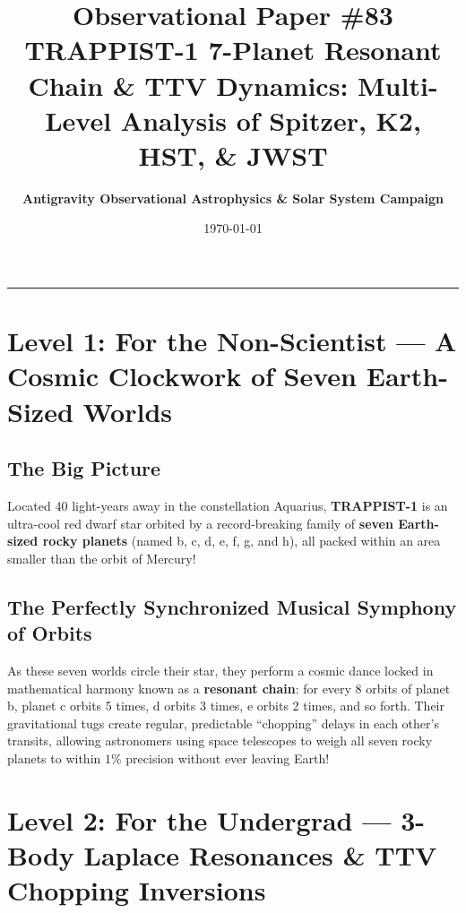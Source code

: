 \documentclass[11pt,a4paper]{article}
\title{\Huge \textbf{Observational Paper \#83}\\ \Large TRAPPIST-1 7-Planet Resonant Chain \& TTV Dynamics: Multi-Level Analysis of Spitzer, K2, HST, \& JWST}
\author{\textbf{Antigravity Observational Astrophysics \& Solar System Campaign}}
\date{\today}
\begin{document}
\maketitle

\vspace{-1em}
\begin{center}
\rule{\textwidth}{1.5pt}
\end{center}

\section*{Level 1: For the Non-Scientist — A Cosmic Clockwork of Seven Earth-Sized Worlds}

\subsection*{The Big Picture}
Located 40 light-years away in the constellation Aquarius, \textbf{TRAPPIST-1} is an ultra-cool red dwarf star orbited by a record-breaking family of \textbf{seven Earth-sized rocky planets} (named b, c, d, e, f, g, and h), all packed within an area smaller than the orbit of Mercury!

\subsection*{The Perfectly Synchronized Musical Symphony of Orbits}
As these seven worlds circle their star, they perform a cosmic dance locked in mathematical harmony known as a \textbf{resonant chain}: for every 8 orbits of planet b, planet c orbits 5 times, d orbits 3 times, e orbits 2 times, and so forth. Their gravitational tugs create regular, predictable ``chopping'' delays in each other's transits, allowing astronomers using space telescopes to weigh all seven rocky planets to within $1\%$ precision without ever leaving Earth!

\newpage

\section*{Level 2: For the Undergrad — 3-Body Laplace Resonances \& TTV Chopping Inversions}
\end{document}
